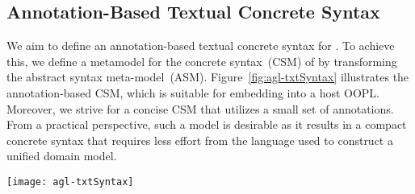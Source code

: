 \subsection{Annotation-Based Textual Concrete Syntax} 
\label{subsect:agl-textual}

We aim to define an annotation-based textual concrete syntax for \agl. To achieve this, we define a metamodel for the concrete syntax~(CSM) of \agl by transforming the abstract syntax meta-model~(ASM). Figure~\ref{fig:agl-txtSyntax} illustrates the annotation-based CSM, which is suitable for embedding into a host OOPL. Moreover, we strive for a concise CSM that utilizes a small set of annotations. From a practical perspective, such a model is desirable as it results in a compact concrete syntax that requires less effort from the language used to construct a unified domain model.

\begin{figure*}[ht]
	\begin{center}
		\texttt{[image: agl-txtSyntax]}
	\end{center}
	\vspace{-0.5cm}
	\caption{Illustration for AGL's annotation-based textual concrete syntax, realized in Java.} %
	\label{fig:agl-txtSyntax}
\end{figure*}

